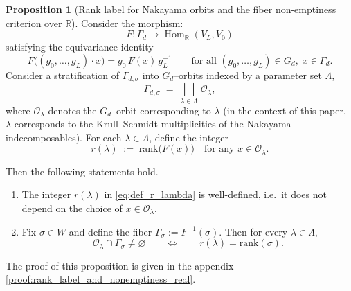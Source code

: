 \documentclass{article}
\newcommand{\Hom}{\operatorname{Hom}}
\theoremstyle{definition}
\newtheorem{proposition}[theorem]{Proposition}
\begin{document}
\begin{proposition}[Rank label for Nakayama orbits and the fiber non-emptiness criterion over $\mathbb{R}$]
\label{prop:rank_label_and_nonemptiness_real}
Consider the morphism:
\[
F:\Gamma_d \longrightarrow \Hom_{\mathbb{R}}(V_L,V_0)
\]
satisfying the equivariance identity
\begin{equation}
\label{eq:equivariance_F}
F\!\big((g_0,\dots,g_L)\cdot x\big)=g_0\,F(x)\,g_L^{-1}
\qquad\text{for all } (g_0,\dots,g_L)\in G_d,\; x\in \Gamma_d .
\end{equation}
\medskip
\noindent
Consider a stratification of $\Gamma_{d,\sigma}$ into $G_d$--orbits indexed by a parameter set $\Lambda$,
\[
\Gamma_{d,\sigma} \;=\; \bigsqcup_{\lambda\in\Lambda}\, \mathcal O_\lambda,
\]
where $\mathcal O_\lambda$ denotes the $G_d$--orbit corresponding to $\lambda$ (in the context of this paper, $\lambda$ corresponds to the Krull--Schmidt multiplicities of the Nakayama indecomposables).  
For each $\lambda\in\Lambda$, define the integer
\begin{equation}
\label{eq:def_r_lambda}
r(\lambda) \;:=\; \mathrm{rank}\big(F(x)\big)\quad \text{for any } x\in \mathcal O_\lambda.
\end{equation}

\medskip
\noindent
Then the following statements hold.

\begin{enumerate}
\item[(i)] The integer $r(\lambda)$ in \eqref{eq:def_r_lambda} is well-defined, i.e.\ it does not depend on the choice of $x\in \mathcal O_\lambda$.
\item[(ii)] Fix $\sigma\in W$ and define the fiber $\Gamma_\sigma:=F^{-1}(\sigma)$. Then for every $\lambda\in\Lambda$,
\begin{equation}
\label{eq:nonemptiness}
\mathcal O_\lambda\cap \Gamma_\sigma \neq \varnothing
\qquad\Longleftrightarrow\qquad
r(\lambda)=\mathrm{rank}(\sigma).
\end{equation}
\end{enumerate}
\end{proposition}
\noindent
The proof of this proposition is given in the appendix \ref{proof:rank_label_and_nonemptiness_real}.
\end{document}
